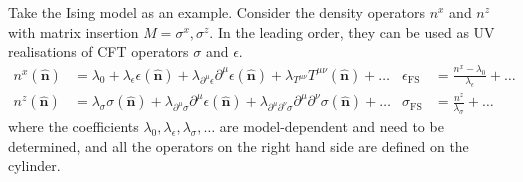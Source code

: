 \documentclass{timesjhep}
\begin{document}
Take the Ising model as an example. Consider the density operators $n^x$ and $n^z$ with matrix insertion $M=\sigma^x,\sigma^z$. In the leading order, they can be used as UV realisations of CFT operators $\sigma$ and $\epsilon$.
\begin{align}
    n^x(\hat{\mathbf{n}})&=\lambda_0+\lambda_\epsilon\epsilon(\hat{\mathbf{n}})+\lambda_{\partial^\mu\epsilon}\partial^\mu\epsilon(\hat{\mathbf{n}})+\lambda_{T^{\mu\nu}}T^{\mu\nu}(\hat{\mathbf{n}})+\dots&\epsilon_\mathrm{FS}&=\frac{n^x-\lambda_0}{\lambda_\epsilon}+\dots\nonumber\\
    n^z(\hat{\mathbf{n}})&=\lambda_\sigma\sigma(\hat{\mathbf{n}})+\lambda_{\partial^\mu\sigma}\partial^\mu\epsilon(\hat{\mathbf{n}})+\lambda_{\partial^\mu\partial^\nu\sigma}\partial^\mu\partial^\nu\sigma(\hat{\mathbf{n}})+\dots&\sigma_\mathrm{FS}&=\frac{n^z}{\lambda_\sigma}+\dots 
\end{align} 
where the coefficients $\lambda_0,\lambda_\epsilon,\lambda_\sigma,\dots$ are model-dependent and need to be determined, and all the operators on the right hand side are defined on the cylinder. 
\end{document}
